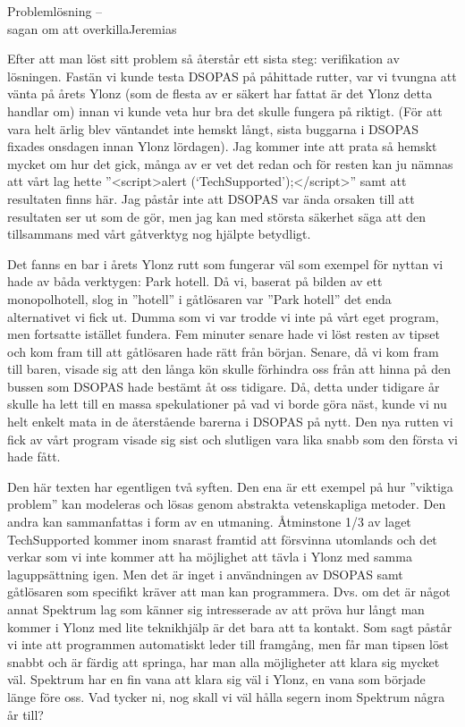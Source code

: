 \documentclass{spektraklet}
\begin{document}
\begin{artikel}{Problemlösning – \\ sagan om att overkilla}{Jeremias}
\begin{twocolumns}
Efter att man löst sitt problem så återstår ett sista steg: verifikation av lösningen. Fastän vi kunde testa DSOPAS på påhittade rutter, var vi tvungna att vänta på årets Ylonz (som de flesta av er säkert har fattat är det Ylonz detta handlar om) innan vi kunde veta hur bra det skulle fungera på riktigt. (För att vara helt ärlig blev väntandet inte hemskt långt, sista buggarna i DSOPAS fixades onsdagen innan Ylonz lördagen). Jag kommer inte att prata så hemskt mycket om hur det gick, många av er vet det redan och för resten kan ju nämnas att vårt lag hette ”<script>alert (‘TechSupported’);</script>” samt att resultaten finns här. Jag påstår inte att DSOPAS var ända orsaken till att resultaten ser ut som de gör, men jag kan med största säkerhet säga att den tillsammans med vårt gåtverktyg nog hjälpte betydligt.

Det fanns en bar i årets Ylonz rutt som fungerar väl som exempel för nyttan vi hade av båda verktygen:  Park hotell. Då vi, baserat på bilden av ett monopolhotell, slog in ”hotell” i gåtlösaren var ”Park hotell” det enda alternativet vi fick ut. Dumma som vi var trodde vi inte på vårt eget program, men fortsatte istället fundera.  Fem minuter senare hade vi löst resten av tipset och kom fram till att gåtlösaren hade rätt från början. Senare, då vi kom fram till baren, visade sig att den långa kön skulle förhindra oss från att hinna på den bussen som DSOPAS hade bestämt åt oss tidigare. Då, detta under tidigare år skulle ha lett till en massa spekulationer på vad vi borde göra näst, kunde vi nu helt enkelt mata in de återstående barerna i DSOPAS på nytt. Den nya rutten vi fick av vårt program visade sig sist och slutligen vara lika snabb som den första vi hade fått.

Den här texten har egentligen två syften. Den ena är ett exempel på hur ”viktiga problem”  kan modeleras och lösas genom abstrakta vetenskapliga metoder. Den andra kan sammanfattas i form av en utmaning. Åtminstone 1/3 av laget TechSupported kommer inom snarast framtid att försvinna utomlands och det verkar som vi inte kommer att ha möjlighet att tävla i Ylonz med samma laguppsättning igen. Men det är inget i användningen av DSOPAS samt gåtlösaren som specifikt kräver att man kan programmera. Dvs. om det är något annat Spektrum lag som känner sig intresserade av att pröva hur långt man kommer i Ylonz med lite teknikhjälp är det bara att ta kontakt. Som sagt påstår vi inte att programmen automatiskt leder till framgång, men får man tipsen löst snabbt och är färdig att springa, har man alla möjligheter att klara sig mycket väl. Spektrum har en fin vana att klara sig väl i Ylonz, en vana som började länge före oss. Vad tycker ni, nog skall vi väl hålla segern inom Spektrum några år till?
\end{twocolumns}

\end{artikel}
\end{document}
